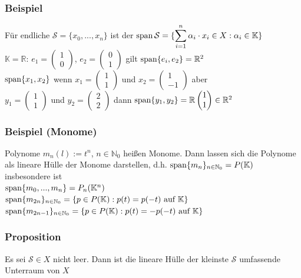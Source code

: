 \subsubsection{Beispiel}
Für endliche $\mathcal{S}=\{x_0,...,x_n\}$ ist der $\displaystyle \operatorname{span}\mathcal{S}=\{\sum^n_{i=1} \alpha_i\cdot x_i\in X: \alpha_i \in \mathbb{K}\}$\\
$\mathbb{K}=\mathbb{R}$: $e_1=\begin{pmatrix}1\\0\end{pmatrix}$, $e_2=\begin{pmatrix}0\\1\end{pmatrix}$ gilt $\operatorname{span}\{e_i,e_2\}=\mathbb{R}^2$\\
$\operatorname{span}\{x_1,x_2\}$ wenn $x_1=\begin{pmatrix}1\\1\end{pmatrix}$ und $x_2=\begin{pmatrix}1\\-1\end{pmatrix}$ aber\\
$y_1=\begin{pmatrix}1\\1\end{pmatrix}$ und $y_2=\begin{pmatrix}2\\2\end{pmatrix}$ dann $\operatorname{span}\{y_1,y_2\} = \mathbb{R} \begin{pmatrix}1\\1\end{pmatrix} \in \mathbb{R}^2$ 
\subsubsection{Beispiel (Monome)}
\label{Monome}
Polynome $m_n(l):=t^n$, $n\in\mathbb{N}_0$ heißen Monome. Dann lassen sich die Polynome als lineare Hülle der Monome darstellen, d.h. $\operatorname{span}\{m_n\}_{n\in\mathbb{N}_0}=P(\mathbb{K})$ insbesondere ist\\
$\operatorname{span}\{m_0,...,m_n\}=P_n(\mathbb{K}^n)$\\
$\operatorname{span}\{m_{2n}\}_{n\in\mathbb{N}_0}=\{p\in P(\mathbb{K}):p(t)=p(-t) \text{ auf } \mathbb{K}\}$\\
$\operatorname{span}\{m_{2n-1}\}_{n\in\mathbb{N}_0}=\{p\in P(\mathbb{K}):p(t)=-p(-t) \text{ auf } \mathbb{K}\}$
\subsubsection{Proposition}
\label{2.3.4}
Es sei $\mathcal{S}\in X$ nicht leer. Dann ist die lineare Hülle der kleinste $\mathcal{S}$ umfassende Unterraum von $X$\\
